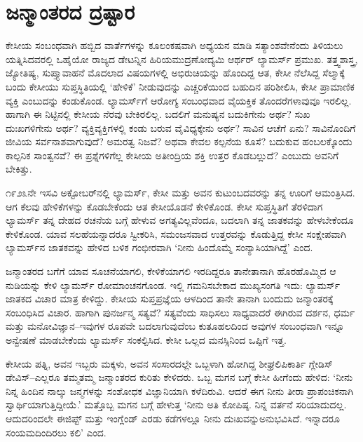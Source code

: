 \section*{ಜನ್ಮಾಂತರದ ದ್ರಷ್ಟಾರ}


ಕೇಸೀಯ ಸಂಬಂಧವಾಗಿ ಹಬ್ಬಿದ ವಾರ್ತೆಗಳನ್ನು ಕೂಲಂಕಷವಾಗಿ ಅಧ್ಯಯನ ಮಾಡಿ ಸತ್ಯಾಂಶ\-ವೇನೆಂದು ತಿಳಿಯಲು ಯತ್ನಿಸಿದವರಲ್ಲಿ ಒಹೈಯೋ ರಾಜ್ಯದ ಡೇಟನ್ನಿನ ಹಿರಿಯ\break ಮುದ್ರಣೋದ್ಯಮಿ ಆರ್ಥರ್ ಲ್ಯಾಮರ್ಸ್ ಪ್ರಮುಖ. ತತ್ತ್ವಶಾಸ್ತ್ರ, ಜ್ಯೋತಿಷ್ಯ, ಸುಪ್ತ್ಯಾವಾಹನೆ ಮೊದಲಾದ ವಿಷಯಗಳಲ್ಲಿ ಅಭಿರುಚಿಯನ್ನು ಹೊಂದಿದ್ದ ಆತ, ಕೇಸೀ ನೆಲೆಸಿದ್ದ ಸೆಲ್ಮಾಕ್ಕೆ ಬಂದು ಕೇಸೀಯು ಸುಪ್ತಸ್ಥಿತಿಯಲ್ಲಿ ‘ಹೇಳಿಕೆ’ ನೀಡುವುದನ್ನು ಎಚ್ಚರಿಕೆಯಿಂದ ಬಹುದಿನ ಪರಿಶೀಲಿಸಿ, ಕೇಸೀ ಪ್ರಾಮಾಣಿಕ ವ್ಯಕ್ತಿ ಎಂಬುದನ್ನು ಕಂಡುಕೊಂಡ. ಲ್ಯಾಮರ್ಸ್​ಗೆ ಆರೋಗ್ಯ ಸಂಬಂಧವಾದ ವೈಯಕ್ತಿಕ ತೊಂದರೆಗಳಾವುವೂ ಇರಲಿಲ್ಲ. ಹಾಗಾಗಿ ಈ ನಿಟ್ಟಿನಲ್ಲಿ ಕೇಸೀಯ ನೆರವು ಬೇಕಿರಲಿಲ್ಲ. ಬದಲಿಗೆ ಮನುಷ್ಯನ ಬದುಕಿಗೇನು ಅರ್ಥ? ಸುಖ ದುಃಖಗಳಿಗೇನು ಅರ್ಥ? ವ್ಯಕ್ತಿವ್ಯಕ್ತಿಗಳಲ್ಲಿ ಕಂಡು ಬರುವ ವೈವಿಧ್ಯಕ್ಕೇನು ಅರ್ಥ? ಸಾವಿನ ಆಚೆಗೆ ಏನು? ಸಾವಿನೊಂದಿಗೆ ಜೀವಿಯ ಸರ್ವನಾಶವಾಗುವುದೆ? ಅಮರತ್ವ ನಿಜವೆ? ಅಥವಾ ಕೇವಲ ಕಲ್ಪನೆಯ ಕೂಸೆ? ಬದುಕುವ ಹಂಬಲಕ್ಕೊಂದು ಕಾಲ್ಪನಿಕ ಸಾಂತ್ವನವೆ? ಈ ಪ್ರಶ್ನೆಗಳಿಗೆಲ್ಲ ಕೇಸೀಯ ಅತೀಂದ್ರಿಯ ಶಕ್ತಿ ಉತ್ತರ ಕೊಡಬಲ್ಲುದೆ? ಎಂಬುದು ಅವನಿಗೆ ಬೇಕಿತ್ತು.

೧೯೨೩ನೇ ಇಸವಿ ಅಕ್ಟೋಬರ್​ನಲ್ಲಿ ಲ್ಯಾಮರ್ಸ್, ಕೇಸೀ ಮತ್ತು ಅವನ ಕುಟುಂಬದವರನ್ನು ತನ್ನ ಊರಿಗೆ ಆಮಂತ್ರಿಸಿದ. ಆಗ ಕೆಲವು ಹೇಳಿಕೆಗಳನ್ನು ಕೊಡಬೇಕೆಂದು ಆತ ಕೇಸೀಯೊಡನೆ ಕೇಳಿಕೊಂಡ. ಕೇಸೀ ಸುಪ್ತಸ್ಥಿತಿಗೆ ತೆರಳಿದಾಗ ಲ್ಯಾಮರ್ಸ್ ತನ್ನ ದೇಹದ ರಚನೆಯ ಬಗ್ಗೆ ಹೇಳುವ ಅಗತ್ಯವಿಲ್ಲವೆಂದೂ, ಬದಲಾಗಿ ತನ್ನ ಜಾತಕವನ್ನು ಹೇಳಬೇಕೆಂದೂ ಕೇಳಿಕೊಂಡ. ಯಾವ ಸಲಹೆಯನ್ನಾದರೂ ಸ್ವೀಕರಿಸಿ, ಸಮಂಜಸವಾದ ಉತ್ತರವನ್ನು ಕೊಡುತ್ತಿದ್ದ ಕೇಸೀ ಸಂಕ್ಷೇಪವಾಗಿ ಲ್ಯಾಮರ್ಸ್​ನ ಜಾತಕವನ್ನು ಹೇಳಿದ ಬಳಿಕ ಗಂಭೀರವಾಗಿ ‘ನೀನು ಹಿಂದೊಮ್ಮೆ ಸಂನ್ಯಾಸಿಯಾಗಿದ್ದೆ’ ಎಂದ.

ಜನ್ಮಾಂತರದ ಬಗೆಗೆ ಯಾವ ಸೂಚನೆಯಾಗಲಿ, ಕೇಳಿಕೆಯಾಗಲಿ ಇರದಿದ್ದರೂ ತಾನೇ\break ತಾನಾಗಿ ಹೊರಹೊಮ್ಮಿದ ಆ ನುಡಿಯನ್ನು ಕೇಳಿ ಲ್ಯಾಮರ್ಸ್ ರೋಮಾಂಚನಗೊಂಡ. ಇಲ್ಲಿ ಗಮನಿಸಬೇಕಾದ ಮುಖ್ಯಸಂಗತಿ ಇದು: ಲ್ಯಾಮರ್ಸ್ ಜಾತಕದ ವಿಚಾರ ಮಾತ್ರ ಕೇಳಿದ್ದು. ಕೇಸೀಯ ಸುಪ್ತಪ್ರಜ್ಞೆಯ ಆಳದಿಂದ ತಾನೇ ತಾನಾಗಿ ಬಂದುದು ಜನ್ಮಾಂತರಕ್ಕೆ ಸಂಬಂಧಿಸಿದ ವಿಚಾರ. ಹಾಗಾಗಿ ಪುನರ್ಜನ್ಮ ಸತ್ಯವೆ? ಸತ್ಯವೆಂದು ಸಾಧಿಸಲು ಸಾಧ್ಯವಾದರೆ ಈಗಿರುವ ದರ್ಶನ, ಧರ್ಮ ಮತ್ತು ಮನೋವಿಜ್ಞಾನ–ಇವುಗಳ ರೂಪವೇ ಬದಲಾಗುವುದೆಂಬ ಕುತೂಹಲದಿಂದ ಅವುಗಳ ಸಂಬಂಧವಾಗಿ ಇನ್ನೂ ಅನ್ವೇಷಣೆ ಮಾಡಬೇಕೆಂದು ಲ್ಯಾಮರ್ಸ್ ಸಂಕಲ್ಪಿಸಿದ. ಕೇಸೀ ಒಲ್ಲದ ಮನಸ್ಸಿನಿಂದ ಒಪ್ಪಿಗೆ ಇತ್ತ.

ಕೇಸೀಯ ಪತ್ನಿ, ಅವನ ಇಬ್ಬರು ಮಕ್ಕಳು, ಅವನ ಸಂಸಾರದಲ್ಲೇ ಒಬ್ಬಳಾಗಿ ಹೋಗಿದ್ದ ಶೀಘ್ರಲಿಪಿಕಾರ್ತಿ ಗ್ಲೇಡಿಸ್ ಡೇವಿಸ್​–ಎಲ್ಲರೂ ತಮ್ಮತಮ್ಮ ಜನ್ಮಾಂತರದ ಕುರಿತು ಕೇಳಿದರು. ಒಬ್ಬ ಮಗನ ಬಗ್ಗೆ ಕೇಸೀ ಹೀಗೆಂದು ಹೇಳಿದ: ‘ನೀನು ನಿನ್ನ ಹಿಂದಿನ ನಾಲ್ಕು ಜನ್ಮಗಳನ್ನು ಸಂಶೋಧಕ ವಿಜ್ಞಾನಿಯಾಗಿ ಕಳೆದಿರುವಿ. ಆದರೆ ಈಗ ನೀನು ತೀರಾ ಪ್ರಾಪಂಚಿಕನಾಗಿ ಸ್ವಾರ್ಥಿಯಾಗುತ್ತಿದ್ದೀಯೆ.’ ಮತ್ತೊಬ್ಬ ಮಗನ ಬಗ್ಗೆ ಹೇಳುತ್ತ ‘ನೀನು ಅತಿ ಕೋಪಿಷ್ಠ. ನಿನ್ನ ವರ್ತನೆ ಸರಿಯಾದುದಲ್ಲ. ಆದುದರಿಂದಲೇ ಈಜಿಪ್ಟ್ ಮತ್ತು ಇಂಗ್ಲೆಂಡ್ ಎರಡು ಕಡೆಗಳಲ್ಲೂ ನೀನು ದುಃಖವನ್ನು\break ಅನುಭವಿಸಿದೆ. ಇನ್ನಾದರೂ ಸಂಯಮದಿಂದಿರಲು ಕಲಿ’ ಎಂದ.


